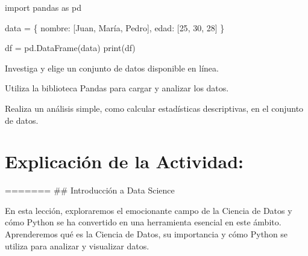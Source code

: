 \documentclass[
  a4paper,
  onepage,
  openany]{scrreprt}
\newenvironment{Shaded}{\begin{snugshade}}{\end{snugshade}}
\newcommand{\BuiltInTok}[1]{\textcolor[rgb]{0.00,0.23,0.31}{#1}}
\newcommand{\DecValTok}[1]{\textcolor[rgb]{0.68,0.00,0.00}{#1}}
\newcommand{\ImportTok}[1]{\textcolor[rgb]{0.00,0.46,0.62}{#1}}
\newcommand{\NormalTok}[1]{\textcolor[rgb]{0.00,0.23,0.31}{#1}}
\newcommand{\OperatorTok}[1]{\textcolor[rgb]{0.37,0.37,0.37}{#1}}
\newcommand{\StringTok}[1]{\textcolor[rgb]{0.13,0.47,0.30}{#1}}
\begin{document}
\begin{Shaded}
\begin{Highlighting}[]
\ImportTok{import}\NormalTok{ pandas }\ImportTok{as}\NormalTok{ pd}

\NormalTok{data }\OperatorTok{=}\NormalTok{ \{}
    \StringTok{\textquotesingle{}nombre\textquotesingle{}}\NormalTok{: [}\StringTok{\textquotesingle{}Juan\textquotesingle{}}\NormalTok{, }\StringTok{\textquotesingle{}María\textquotesingle{}}\NormalTok{, }\StringTok{\textquotesingle{}Pedro\textquotesingle{}}\NormalTok{],}
    \StringTok{\textquotesingle{}edad\textquotesingle{}}\NormalTok{: [}\DecValTok{25}\NormalTok{, }\DecValTok{30}\NormalTok{, }\DecValTok{28}\NormalTok{]}
\NormalTok{\}}

\NormalTok{df }\OperatorTok{=}\NormalTok{ pd.DataFrame(data)}
\BuiltInTok{print}\NormalTok{(df)}
\end{Highlighting}
\end{Shaded}

\begin{tcolorbox}[enhanced jigsaw, breakable, opacityback=0, toptitle=1mm, coltitle=black, toprule=.15mm, rightrule=.15mm, colframe=quarto-callout-important-color-frame, opacitybacktitle=0.6, arc=.35mm, title=\textcolor{quarto-callout-important-color}{\faExclamation}\hspace{0.5em}{Actividad Práctica:}, titlerule=0mm, colbacktitle=quarto-callout-important-color!10!white, bottomtitle=1mm, bottomrule=.15mm, colback=white, left=2mm, leftrule=.75mm]

Investiga y elige un conjunto de datos disponible en línea.

Utiliza la biblioteca Pandas para cargar y analizar los datos.

Realiza un análisis simple, como calcular estadísticas descriptivas, en
el conjunto de datos.

\end{tcolorbox}

\hypertarget{explicaciuxf3n-de-la-actividad-78}{%
\section{Explicación de la
Actividad:}\label{explicaciuxf3n-de-la-actividad-78}}

======= \#\# Introducción a Data Science

En esta lección, exploraremos el emocionante campo de la Ciencia de
Datos y cómo Python se ha convertido en una herramienta esencial en este
ámbito. Aprenderemos qué es la Ciencia de Datos, su importancia y cómo
Python se utiliza para analizar y visualizar datos.
\end{document}
